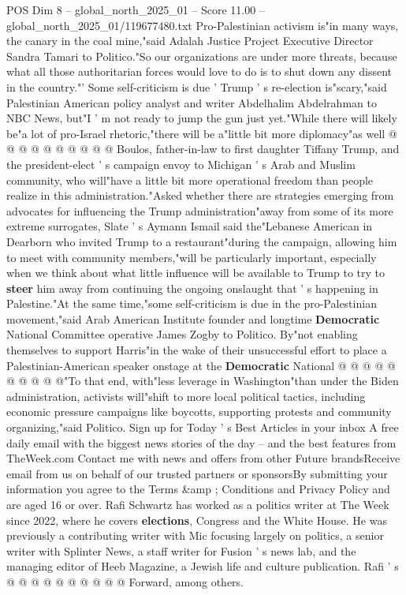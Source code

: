 \begin{textsample}{POS Dim 8 – global\_north\_2025\_01 – Score 11.00 – global\_north\_2025\_01/119677480.txt}
Pro-Palestinian activism is"in many ways, the canary in the coal mine,"said Adalah Justice Project Executive Director Sandra Tamari to Politico."So our organizations are under more threats, because what all those authoritarian forces would love to do is to shut down any dissent in the country."' Some self-criticism is due ' Trump ' s re-election is"scary,"said Palestinian American policy analyst and writer Abdelhalim Abdelrahman to NBC News, but"I ' m not ready to jump the gun just yet."While there will likely be"a lot of pro-Israel rhetoric,"there will be a"little bit more diplomacy"as well @ @ @ @ @ @ @ @ @ @ Boulos, father-in-law to first daughter Tiffany Trump, and the president-elect ' s campaign envoy to Michigan ' s Arab and Muslim community, who will"have a little bit more operational freedom than people realize in this administration."Asked whether there are strategies emerging from advocates for influencing the Trump administration"away from some of its more extreme surrogates, Slate ' s Aymann Ismail said the"Lebanese American in Dearborn who invited Trump to a restaurant"during the campaign, allowing him to meet with community members,"will be particularly important, especially when we think about what little influence will be available to Trump to try to \textbf{steer} him away from continuing the ongoing onslaught that ' s happening in Palestine."At the same time,"some self-criticism is due in the pro-Palestinian movement,"said Arab American Institute founder and longtime \textbf{Democratic} National Committee operative James Zogby to Politico.
By"not enabling themselves to support Harris"in the wake of their unsuccessful effort to place a Palestinian-American speaker onstage at the \textbf{Democratic} National @ @ @ @ @ @ @ @ @ @"To that end, with"less leverage in Washington"than under the Biden administration, activists will"shift to more local political tactics, including economic pressure campaigns like boycotts, supporting protests and community organizing,"said Politico.
Sign up for Today ' s Best Articles in your inbox A free daily email with the biggest news stories of the day -- and the best features from TheWeek.com Contact me with news and offers from other Future brandsReceive email from us on behalf of our trusted partners or sponsorsBy submitting your information you agree to the Terms \&amp ; Conditions and Privacy Policy and are aged 16 or over.
Rafi Schwartz has worked as a politics writer at The Week since 2022, where he covers \textbf{elections}, Congress and the White House.
He was previously a contributing writer with Mic focusing largely on politics, a senior writer with Splinter News, a staff writer for Fusion ' s news lab, and the managing editor of Heeb Magazine, a Jewish life and culture publication.
Rafi ' s @ @ @ @ @ @ @ @ @ @ Forward, among others.

\end{textsample}
